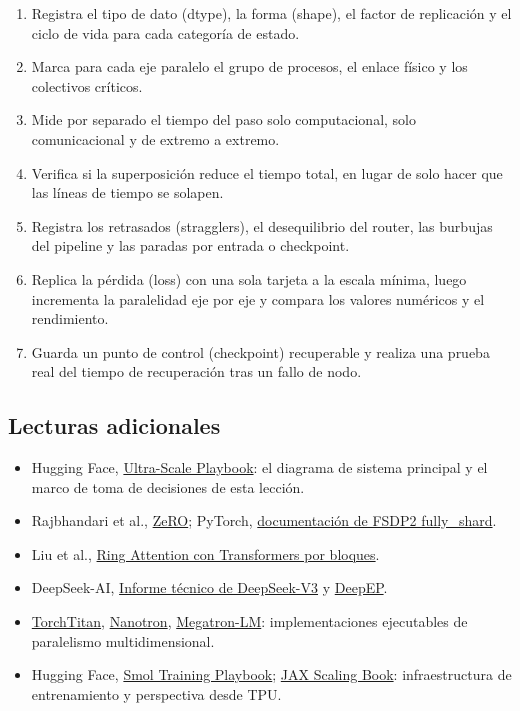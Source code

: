 \documentclass[a4paper]{article}
\begin{document}
\begin{enumerate}
  \item Registra el tipo de dato (dtype), la forma (shape), el factor de replicación y el ciclo de vida para cada categoría de estado.
  \item Marca para cada eje paralelo el grupo de procesos, el enlace físico y los colectivos críticos.
  \item Mide por separado el tiempo del paso solo computacional, solo comunicacional y de extremo a extremo.
  \item Verifica si la superposición reduce el tiempo total, en lugar de solo hacer que las líneas de tiempo se solapen.
  \item Registra los retrasados (stragglers), el desequilibrio del router, las burbujas del pipeline y las paradas por entrada o checkpoint.
  \item Replica la pérdida (loss) con una sola tarjeta a la escala mínima, luego incrementa la paralelidad eje por eje y compara los valores numéricos y el rendimiento.
  \item Guarda un punto de control (checkpoint) recuperable y realiza una prueba real del tiempo de recuperación tras un fallo de nodo.
\end{enumerate}

\subsection{Lecturas adicionales}

\begin{itemize}
  \item Hugging Face, \href{https://huggingface.co/spaces/nanotron/ultrascale-playbook}{Ultra-Scale Playbook}: el diagrama de sistema principal y el marco de toma de decisiones de esta lección.
  \item Rajbhandari et al., \href{https://arxiv.org/abs/1910.02054}{ZeRO}; PyTorch, \href{https://docs.pytorch.org/docs/stable/distributed.fsdp.fully_shard.html}{documentación de FSDP2 fully\_shard}.
  \item Liu et al., \href{https://arxiv.org/abs/2310.01889}{Ring Attention con Transformers por bloques}.
  \item DeepSeek-AI, \href{https://arxiv.org/abs/2412.19437}{Informe técnico de DeepSeek-V3} y \href{https://github.com/deepseek-ai/DeepEP}{DeepEP}.
  \item \href{https://github.com/pytorch/torchtitan}{TorchTitan}, \href{https://github.com/huggingface/nanotron}{Nanotron}, \href{https://github.com/NVIDIA/Megatron-LM}{Megatron-LM}: implementaciones ejecutables de paralelismo multidimensional.
  \item Hugging Face, \href{https://huggingface.co/spaces/HuggingFaceTB/smol-training-playbook}{Smol Training Playbook}; \href{https://jax-ml.github.io/scaling-book/tpus/}{JAX Scaling Book}: infraestructura de entrenamiento y perspectiva desde TPU.
\end{itemize}
\end{document}
